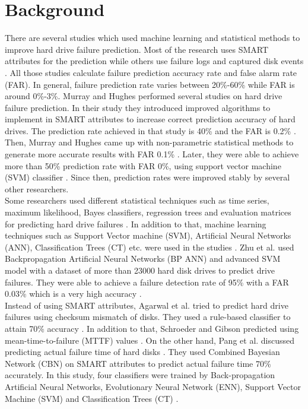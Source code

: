 \documentclass[conference]{IEEEtran}
\begin{document}
\section{Background}

There are several studies which used machine learning and statistical methods to improve hard drive failure prediction. Most of the research uses SMART attributes for the prediction \cite{b2,b3,b4} while others use failure logs and captured disk events  \cite{b6,b7}. All those studies calculate failure prediction accuracy rate and false alarm rate (FAR). In general, failure prediction rate varies between 20\%-60\% while FAR is around 0\%-3\%.
Murray and Hughes performed several studies on hard drive failure prediction. In their study \cite{b3} they introduced improved algorithms to implement in SMART attributes to increase correct prediction accuracy of hard drives. The prediction rate achieved in that study is 40\% and the FAR is 0.2\% \cite{b3}. Then, Murray and Hughes came up with non-parametric statistical methods to generate more accurate results with FAR 0.1\% \cite{b8}. Later, they were able to achieve more than 50\% prediction rate with FAR 0\%, using support vector machine (SVM) classifier \cite{b9}. Since then, prediction rates were improved stably by several other researchers.\\

Some researchers used different statistical techniques such as time series, maximum likelihood, Bayes classifiers, regression trees and evaluation matrices for predicting hard drive failures \cite{b4,b6,b10}. In addition to that, machine learning techniques such as Support Vector machine (SVM), Artificial Neural Networks (ANN), Classification Trees (CT) etc. were used in the studies \cite{b2,b4}. Zhu et al. used Backpropagation Artificial Neural Networks (BP ANN) and advanced SVM model with a dataset of more than 23000 hard disk drives to predict drive failures. They were able to achieve a failure detection rate of 95\% with a FAR 0.03\% which is a very high accuracy \cite{b4}.\\

Instead of using SMART attributes, Agarwal et al. tried to predict hard drive failures using checksum mismatch of disks. They used a rule-based classifier to attain 70\% accuracy \cite{b6}. In addition to that, Schroeder and Gibson predicted using mean-time-to-failure (MTTF) values \cite{b7}. On the other hand, Pang et al. discussed predicting actual failure time of hard disks \cite{b2}. They used Combined Bayesian Network (CBN) on SMART attributes to predict actual failure time 70\% accurately. In this study, four classifiers were trained by Back-propagation Artificial Neural Networks, Evolutionary Neural Network (ENN), Support Vector Machine (SVM) and Classification Trees (CT) \cite{b2}.\\
\end{document}
